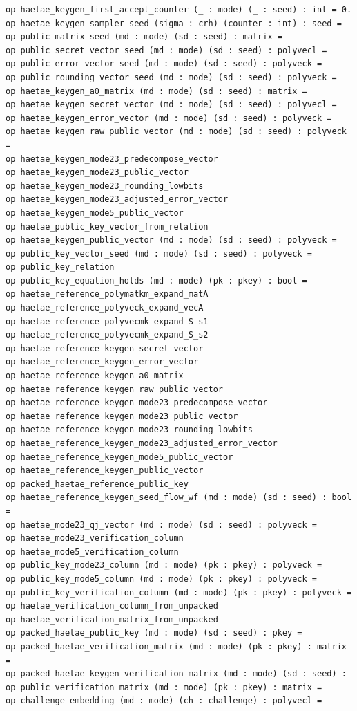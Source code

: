 \begin{lstlisting}[language=EasyCrypt,basicstyle=\ttfamily\tiny]
op haetae_keygen_first_accept_counter (_ : mode) (_ : seed) : int = 0.
op haetae_keygen_sampler_seed (sigma : crh) (counter : int) : seed =
op public_matrix_seed (md : mode) (sd : seed) : matrix =
op public_secret_vector_seed (md : mode) (sd : seed) : polyvecl =
op public_error_vector_seed (md : mode) (sd : seed) : polyveck =
op public_rounding_vector_seed (md : mode) (sd : seed) : polyveck =
op haetae_keygen_a0_matrix (md : mode) (sd : seed) : matrix =
op haetae_keygen_secret_vector (md : mode) (sd : seed) : polyvecl =
op haetae_keygen_error_vector (md : mode) (sd : seed) : polyveck =
op haetae_keygen_raw_public_vector (md : mode) (sd : seed) : polyveck =
op haetae_keygen_mode23_predecompose_vector
op haetae_keygen_mode23_public_vector
op haetae_keygen_mode23_rounding_lowbits
op haetae_keygen_mode23_adjusted_error_vector
op haetae_keygen_mode5_public_vector
op haetae_public_key_vector_from_relation
op haetae_keygen_public_vector (md : mode) (sd : seed) : polyveck =
op public_key_vector_seed (md : mode) (sd : seed) : polyveck =
op public_key_relation
op public_key_equation_holds (md : mode) (pk : pkey) : bool =
op haetae_reference_polymatkm_expand_matA
op haetae_reference_polyveck_expand_vecA
op haetae_reference_polyvecmk_expand_S_s1
op haetae_reference_polyvecmk_expand_S_s2
op haetae_reference_keygen_secret_vector
op haetae_reference_keygen_error_vector
op haetae_reference_keygen_a0_matrix
op haetae_reference_keygen_raw_public_vector
op haetae_reference_keygen_mode23_predecompose_vector
op haetae_reference_keygen_mode23_public_vector
op haetae_reference_keygen_mode23_rounding_lowbits
op haetae_reference_keygen_mode23_adjusted_error_vector
op haetae_reference_keygen_mode5_public_vector
op haetae_reference_keygen_public_vector
op packed_haetae_reference_public_key
op haetae_reference_keygen_seed_flow_wf (md : mode) (sd : seed) : bool =
op haetae_mode23_qj_vector (md : mode) (sd : seed) : polyveck =
op haetae_mode23_verification_column
op haetae_mode5_verification_column
op public_key_mode23_column (md : mode) (pk : pkey) : polyveck =
op public_key_mode5_column (md : mode) (pk : pkey) : polyveck =
op public_key_verification_column (md : mode) (pk : pkey) : polyveck =
op haetae_verification_column_from_unpacked
op haetae_verification_matrix_from_unpacked
op packed_haetae_public_key (md : mode) (sd : seed) : pkey =
op packed_haetae_verification_matrix (md : mode) (pk : pkey) : matrix =
op packed_haetae_keygen_verification_matrix (md : mode) (sd : seed) :
op public_verification_matrix (md : mode) (pk : pkey) : matrix =
op challenge_embedding (md : mode) (ch : challenge) : polyvecl =

\end{lstlisting}
